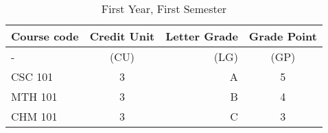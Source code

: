 \documentclass{article}
\begin{document}
	\begin{table}[h!] 
		\begin{center}
		\caption{First Year, First Semester}
		\label{tab:table1}
		\begin{tabular}{l|c|r|c}
			\textbf{Course code} & \textbf{Credit Unit} & \textbf{Letter Grade} & \textbf{Grade Point}\\ 
			\hline 
			- & (CU) & (LG) & (GP) \\
			CSC 101 & 3 & A & 5\\
			MTH 101 & 3 & B & 4\\
			CHM 101 & 3 & C & 3\\
		\end{tabular}
 	\end{center}
\end{table}
\end{document}

